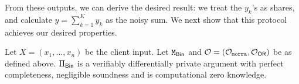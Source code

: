 From these outputs, we can derive the desired result: we treat the $y_k$'s as shares, and calculate $y = \sum_{k=1}^{K} y_k$ as the noisy sum.  
We next show that this protocol achieves our desired properties. 
\begin{thm}
\label{theorem:verifiable_dp_feasible} 
Let $X=(x_1, \dots, x_n)$ be the client input. Let $\mathtt{M}_{\mathsf{Bin}}$ and $\mathcal{O} = (\mathcal{O}_{\mathtt{morra}}, \mathcal{O}_{\mathsf{OR}})$ be as defined above.  $\Pi_{\mathsf{Bin}}$ is a verifiably differentially private argument with perfect completeness, negligible soundness and is computational zero knowledge.


\end{thm}
